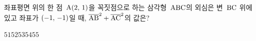 좌표평면 위의 한 점~$\mathrm{A}(2,\mkern3mu 1)$을 꼭짓점으로 하는 삼각형~$\mathrm{ABC}$의 외심은 변~$\mathrm{BC}$ 위에 있고 좌표가 $(-1,\mkern3mu -1)$일 때, $\overline{\mathrm{AB}}^2+\overline{\mathrm{AC}}^2$의 값은?
\begin{choices32}{$51$}{$52$}{$53$}{$54$}{$55$}\end{choices32}
